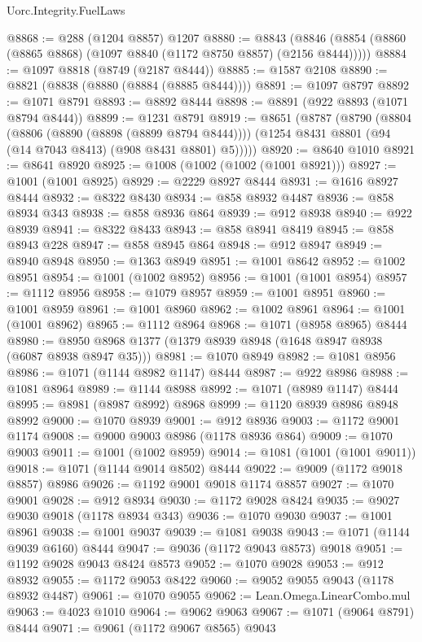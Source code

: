 \begin{lexlean}{Uorc.Integrity.FuelLaws}
\begin{coremodule}
@8868 := @288 (@1204 @8857) @1207
@8880 := @8843 (@8846 (@8854 (@8860 (@8865 @8868) (@1097 @8840 (@1172 @8750 @8857) (@2156 @8444)))))
@8884 := @1097 @8818 (@8749 (@2187 @8444))
@8885 := @1587 @2108
@8890 := @8821 (@8838 (@8880 (@8884 (@8885 @8444))))
@8891 := @1097 @8797
@8892 := @1071 @8791
@8893 := @8892 @8444
@8898 := @8891 (@922 @8893 (@1071 @8794 @8444))
@8899 := @1231 @8791
@8919 := @8651
    (@8787
      (@8790
        (@8804
          (@8806 (@8890 (@8898 (@8899 @8794 @8444))))
          (@1254 @8431 @8801 (@94 (@14 @7043 @8413) (@908 @8431 @8801) @5)))))
@8920 := @8640 @1010
@8921 := @8641 @8920
@8925 := @1008 (@1002 (@1002 (@1001 @8921)))
@8927 := @1001 (@1001 @8925)
@8929 := @2229 @8927 @8444
@8931 := @1616 @8927 @8444
@8932 := @8322 @8430
@8934 := @858 @8932 @4487
@8936 := @858 @8934 @343
@8938 := @858 @8936 @864
@8939 := @912 @8938
@8940 := @922 @8939
@8941 := @8322 @8433
@8943 := @858 @8941 @8419
@8945 := @858 @8943 @228
@8947 := @858 @8945 @864
@8948 := @912 @8947
@8949 := @8940 @8948
@8950 := @1363 @8949
@8951 := @1001 @8642
@8952 := @1002 @8951
@8954 := @1001 (@1002 @8952)
@8956 := @1001 (@1001 @8954)
@8957 := @1112 @8956
@8958 := @1079 @8957
@8959 := @1001 @8951
@8960 := @1001 @8959
@8961 := @1001 @8960
@8962 := @1002 @8961
@8964 := @1001 (@1001 @8962)
@8965 := @1112 @8964
@8968 := @1071 (@8958 @8965) @8444
@8980 := @8950 @8968 @1377 (@1379 @8939 @8948 (@1648 @8947 @8938 (@6087 @8938 @8947 @35)))
@8981 := @1070 @8949
@8982 := @1081 @8956
@8986 := @1071 (@1144 @8982 @1147) @8444
@8987 := @922 @8986
@8988 := @1081 @8964
@8989 := @1144 @8988
@8992 := @1071 (@8989 @1147) @8444
@8995 := @8981 (@8987 @8992) @8968
@8999 := @1120 @8939 @8986 @8948 @8992
@9000 := @1070 @8939
@9001 := @912 @8936
@9003 := @1172 @9001 @1174
@9008 := @9000 @9003 @8986 (@1178 @8936 @864)
@9009 := @1070 @9003
@9011 := @1001 (@1002 @8959)
@9014 := @1081 (@1001 (@1001 @9011))
@9018 := @1071 (@1144 @9014 @8502) @8444
@9022 := @9009 (@1172 @9018 @8857) @8986
@9026 := @1192 @9001 @9018 @1174 @8857
@9027 := @1070 @9001
@9028 := @912 @8934
@9030 := @1172 @9028 @8424
@9035 := @9027 @9030 @9018 (@1178 @8934 @343)
@9036 := @1070 @9030
@9037 := @1001 @8961
@9038 := @1001 @9037
@9039 := @1081 @9038
@9043 := @1071 (@1144 @9039 @6160) @8444
@9047 := @9036 (@1172 @9043 @8573) @9018
@9051 := @1192 @9028 @9043 @8424 @8573
@9052 := @1070 @9028
@9053 := @912 @8932
@9055 := @1172 @9053 @8422
@9060 := @9052 @9055 @9043 (@1178 @8932 @4487)
@9061 := @1070 @9055
@9062 := Lean.Omega.LinearCombo.mul
@9063 := @4023 @1010
@9064 := @9062 @9063
@9067 := @1071 (@9064 @8791) @8444
@9071 := @9061 (@1172 @9067 @8565) @9043

\end{coremodule}
\end{lexlean}
